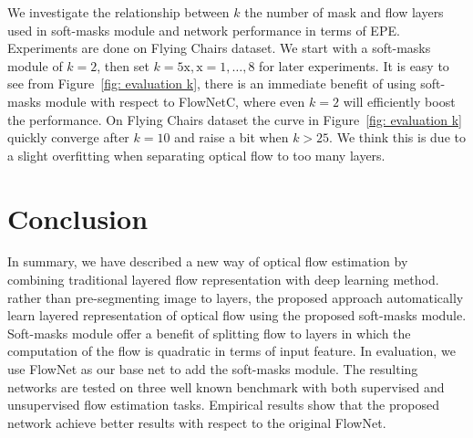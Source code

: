 \documentclass[10pt,twocolumn,letterpaper]{article}
\begin{document}
We investigate the relationship between $k$ the number of mask and flow layers used in soft-masks module and network performance in terms of EPE. Experiments are done on Flying Chairs dataset. We start with a soft-masks module of $k=2$, then set $k=5\mathrm{x}, \mathrm{x}=1, \dots, 8$ for later experiments. It is easy to see from Figure~\ref{fig: evaluation k}, there is an immediate benefit of using soft-masks module with respect to FlowNetC, where even $k=2$ will efficiently boost the performance. On Flying Chairs dataset the curve in Figure~\ref{fig: evaluation k} quickly converge after $k=10$ and raise a bit when $k>25$. We think this is due to a slight overfitting when separating optical flow to too many layers. 



\section{Conclusion}
In summary, we have described a new way of optical flow estimation by combining traditional layered flow representation with deep learning method. rather than pre-segmenting image to layers, the proposed approach automatically learn layered representation of optical flow using the proposed soft-masks module. Soft-masks module offer a benefit of splitting flow to layers in which the computation of the flow is quadratic in terms of input feature. In evaluation, we use FlowNet as our base net to add the soft-masks module. The resulting networks are tested on three well known benchmark with both supervised and unsupervised flow estimation tasks. Empirical results show that the proposed network achieve better results with respect to the original FlowNet. 


{\small


}
\end{document}
